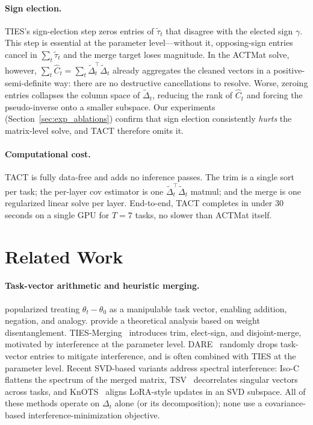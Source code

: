 \documentclass{article}
\theoremstyle{plain}
\theoremstyle{definition}
\theoremstyle{remark}
\begin{document}
\paragraph{Sign election.} TIES's sign-election step zeros entries of $\tilde\tau_t$ that disagree with the elected sign $\gamma$. This step is essential at the parameter level---without it, opposing-sign entries cancel in $\sum_t \tilde\tau_t$ and the merge target loses magnitude. In the ACTMat solve, however, $\sum_t \hat{C}_t = \sum_t \tilde\Delta_t^\top \tilde\Delta_t$ already aggregates the cleaned vectors in a positive-semi-definite way: there are no destructive cancellations to resolve. Worse, zeroing entries collapses the column space of $\tilde\Delta_t$, reducing the rank of $\hat{C}_t$ and forcing the pseudo-inverse onto a smaller subspace. Our experiments (Section~\ref{sec:exp_ablations}) confirm that sign election consistently \emph{hurts} the matrix-level solve, and TACT therefore omits it.

\paragraph{Computational cost.}
TACT is fully data-free and adds no inference passes. The trim is a single sort per task; the per-layer cov estimator is one $\tilde\Delta_t^\top \tilde\Delta_t$ matmul; and the merge is one regularized linear solve per layer. End-to-end, TACT completes in under 30 seconds on a single GPU for $T=7$ tasks, no slower than ACTMat itself.

\section{Related Work}
\label{sec:related}

\paragraph{Task-vector arithmetic and heuristic merging.} \citet{ilharco2023editing} popularized treating $\theta_t - \theta_0$ as a manipulable task vector, enabling addition, negation, and analogy. \citet{ortizjimenez2023task} provide a theoretical analysis based on weight disentanglement. TIES-Merging~\citep{yadav2023ties} introduces trim, elect-sign, and disjoint-merge, motivated by interference at the parameter level. DARE~\citep{yu2024language} randomly drops task-vector entries to mitigate interference, and is often combined with TIES at the parameter level. Recent SVD-based variants address spectral interference: Iso-C~\citep{marczak2025isoc} flattens the spectrum of the merged matrix, TSV~\citep{gargiulo2025tsv} decorrelates singular vectors across tasks, and KnOTS~\citep{stoica2025knots} aligns LoRA-style updates in an SVD subspace. All of these methods operate on $\Delta_t$ alone (or its decomposition); none use a covariance-based interference-minimization objective.
\end{document}
